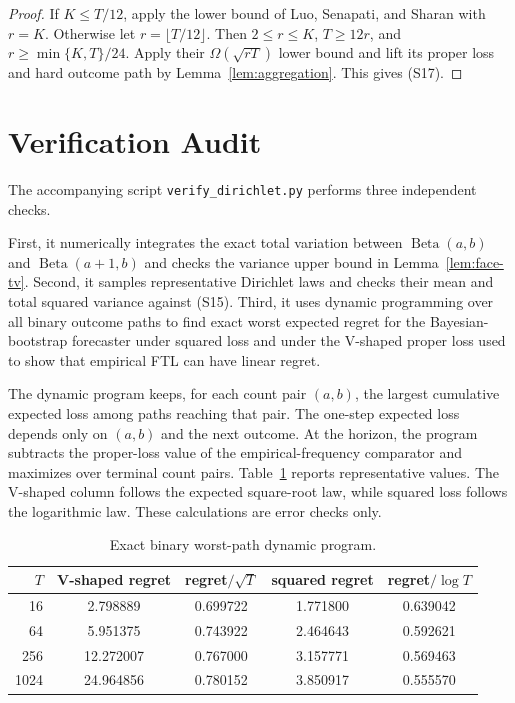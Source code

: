 \documentclass[twoside]{article}
\begin{document}
\begin{proof}
If $K\leq T/12$, apply the lower bound of Luo, Senapati, and Sharan with $r=K$. Otherwise let $r=\lfloor T/12\rfloor$. Then $2\leq r\leq K$, $T\geq12r$, and $r\geq\min\{K,T\}/24$. Apply their $\Omega(\sqrt{rT})$ lower bound and lift its proper loss and hard outcome path by Lemma~\ref{lem:aggregation}. This gives (S17).
\end{proof}

\section{Verification Audit}

The accompanying script \texttt{verify\_dirichlet.py} performs three independent checks.

First, it numerically integrates the exact total variation between $\operatorname{Beta}(a,b)$ and $\operatorname{Beta}(a+1,b)$ and checks the variance upper bound in Lemma~\ref{lem:face-tv}. Second, it samples representative Dirichlet laws and checks their mean and total squared variance against (S15). Third, it uses dynamic programming over all binary outcome paths to find exact worst expected regret for the Bayesian-bootstrap forecaster under squared loss and under the V-shaped proper loss used to show that empirical FTL can have linear regret.

The dynamic program keeps, for each count pair $(a,b)$, the largest cumulative expected loss among paths reaching that pair. The one-step expected loss depends only on $(a,b)$ and the next outcome. At the horizon, the program subtracts the proper-loss value of the empirical-frequency comparator and maximizes over terminal count pairs. Table~\ref{tab:audit} reports representative values. The V-shaped column follows the expected square-root law, while squared loss follows the logarithmic law. These calculations are error checks only.

\begin{table}[h]
\caption{Exact binary worst-path dynamic program.}
\label{tab:audit}
\centering
\begin{tabular}{rcccc}
\toprule
$T$ & V-shaped regret & regret$/\sqrt T$ & squared regret & regret$/\log T$\\
\midrule
16 & 2.798889 & 0.699722 & 1.771800 & 0.639042\\
64 & 5.951375 & 0.743922 & 2.464643 & 0.592621\\
256 & 12.272007 & 0.767000 & 3.157771 & 0.569463\\
1024 & 24.964856 & 0.780152 & 3.850917 & 0.555570\\
\bottomrule
\end{tabular}
\end{table}
\end{document}
